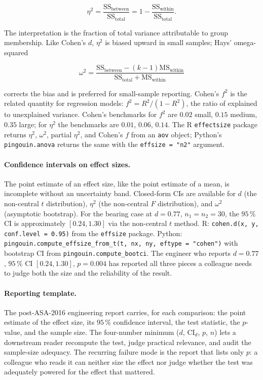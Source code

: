 \[
\eta^{2} = \frac{\text{SS}_{\text{between}}}{\text{SS}_{\text{total}}}
= 1 - \frac{\text{SS}_{\text{within}}}{\text{SS}_{\text{total}}}.
\]

The interpretation is the fraction of total variance attributable
to group membership. Like Cohen's $d$, $\eta^{2}$ is biased upward
in small samples; Hays' omega-squared
\cite{text:ch08t3b-hays-1994}

\[
\omega^{2} = \frac{\text{SS}_{\text{between}} - (k - 1)
\text{MS}_{\text{within}}}{\text{SS}_{\text{total}} +
\text{MS}_{\text{within}}}
\]

corrects the bias and is preferred for small-sample reporting.
Cohen's $f^{2}$ is the related quantity for regression models:
$f^{2} = R^{2}/(1 - R^{2})$, the ratio of explained to unexplained
variance. Cohen's benchmarks for $f^{2}$ are $0.02$ small, $0.15$
medium, $0.35$ large; for $\eta^{2}$ the benchmarks are $0.01$,
$0.06$, $0.14$. The R \texttt{effectsize} package returns
$\eta^{2}$, $\omega^{2}$, partial $\eta^{2}$, and Cohen's $f$ from
an \texttt{aov} object; Python's \texttt{pingouin.anova} returns
the same with the \texttt{effsize = "n2"} argument.

\paragraph{Confidence intervals on effect sizes.} The point
estimate of an effect size, like the point estimate of a mean, is
incomplete without an uncertainty band. Closed-form CIs are
available for $d$ (the non-central $t$ distribution), $\eta^{2}$
(the non-central $F$ distribution), and $\omega^{2}$ (asymptotic
bootstrap). For the bearing case at $d = 0.77$, $n_{1} = n_{2} = 30$,
the $95 \,\%$ CI is approximately $[0.24, 1.30]$ via the
non-central $t$ method. R: \texttt{cohen.d(x, y, conf.level =
0.95)} from the \texttt{effsize} package. Python:
\texttt{pingouin.compute\_effsize\_from\_t(t, nx, ny,
eftype = "cohen")} with bootstrap CI from
\texttt{pingouin.compute\_bootci}. The engineer who reports $d =
0.77$, $95 \,\%$ CI $[0.24, 1.30]$, $p = 0.004$ has reported all
three pieces a colleague needs to judge both the size and the
reliability of the result.

\paragraph{Reporting template.} The post-ASA-2016 engineering
report carries, for each comparison: the point estimate of the
effect size, its $95 \,\%$ confidence interval, the test statistic,
the $p$-value, and the sample size. The four-number minimum
($d$, $\text{CI}_{d}$, $p$, $n$) lets a downstream reader recompute
the test, judge practical relevance, and audit the sample-size
adequacy. The recurring failure mode is the report that lists only
$p$: a colleague who reads it can neither size the effect nor
judge whether the test was adequately powered for the effect that
mattered.

